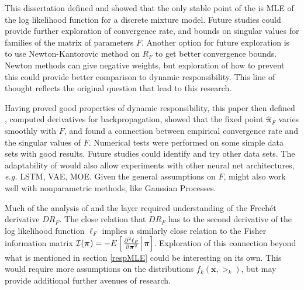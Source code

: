 \label{sect:conclusions}
This dissertation defined \DR and showed that the only stable point of \DR the is MLE of the log likelihood function for a discrete mixture model. Future studies could provide further exploration of convergence rate, and bounds on singular values for families of the matrix of parameters \( F \). Another option for future exploration is to use Newton-Kantorovic method on \( R_F \) to get better convergence bounds.  Newton methods can give negative weights, but exploration of how to prevent this could provide better comparison to dynamic responsibility.  This line of thought reflects the original question that lead to this research.

Having proved good properties of dynamic responsibility, this paper then defined \RS, computed derivatives for backpropagation, showed that  the fixed point \( \hat{\bm \pi}_F \) varies smoothly with \( F \), and found a connection  between empirical convergence rate and the singular values of \( F \). Numerical tests were performed on some simple data sets with good results. Future studies could identify and try other data sets. The adaptability of \RS would also allow experiments with other neural net architectures, \textit{e.g.} LSTM, VAE, MOE. Given the general assumptions on \( F \), \RS might also work well with nonparametric methods, like Gaussian Processes.

Much of the analysis of \DR and the \RS layer required understanding of the Frech\'et derivative \( DR_F \). The close relation that \( DR_F \) has to the second derivative of the log likelihood function \( \ell_{F} \) implies a similarly close relation to the Fisher information matrix \( \mathcal{I}(\bm\pi) = -E\left[\left.\pdv[2]{\ell_F}{\bm\pi}\right|\bm\pi\right] \). Exploration of this connection beyond what is mentioned in section \ref{respMLE} could be interesting on its own.  This would require more assumptions on the distributions \( f_k(\bm x,\bm\gt_k) \), but may provide additional further avenues of research.

